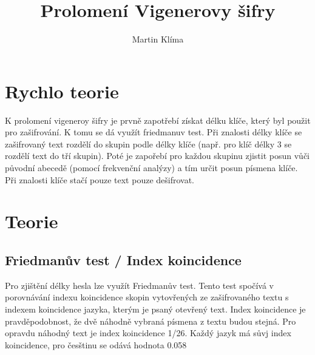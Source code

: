\documentclass{article}
\title{Prolomení Vigenerovy šifry}
\author{Martin Klíma}
\begin{document}
\maketitle

\section{Rychlo teorie}
K prolomení vigeneroy šifry je prvně zapotřebí získat délku klíče, který byl použit pro zašifrování. K tomu se dá využít friedmanuv test. Při znalosti délky klíče se zašifrovaný text rozdělí do skupin podle délky klíče (např. pro klíč délky 3 se rozdělí text do tří skupin). Poté je zapořebí pro každou skupinu zjistit posun vůči původní abecedě (pomocí frekvenční analýzy) a tím určit posun písmena klíče. Při znalosti klíče stačí pouze text pouze dešifrovat.

\section{Teorie}
\subsection{Friedmanův test / Index koincidence}
Pro zjištění délky hesla lze využít Friedmanův test. Tento test spočívá v porovnávání indexu koincidence skopin vytovřených ze zašifrovaného textu s indexem koincidence jazyka, kterým je psaný otevřený text. Index koincidence je pravděpodobnost, že dvě náhodně vybraná písmena z textu budou stejná. Pro opravdu náhodný text je index koincidence 1/26. Každý jazyk má sůvj index koincidence, pro česštinu se odává hodnota 0.058  
\end{document}
